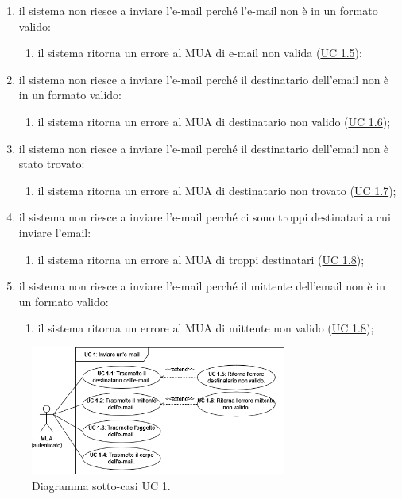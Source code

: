 \begin{itemize}
        \begin{enumerate}[label=\alph*.]
            \item il sistema non riesce a inviare l'e-mail perché l'e-mail non è in un formato valido:
            \begin{enumerate}[label=\arabic*.]
                \item il sistema ritorna un errore al MUA di e-mail non valida (\hyperref[sec:UC1.5]{UC 1.5});
            \end{enumerate}
            \item il sistema non riesce a inviare l'e-mail perché il destinatario dell'email non è in un formato valido:
            \begin{enumerate}[label=\arabic*.]
                \item il sistema ritorna un errore al MUA di destinatario non valido (\hyperref[sec:UC1.6]{UC 1.6});
            \end{enumerate}
            \item il sistema non riesce a inviare l'e-mail perché il destinatario dell'email non è stato trovato:
            \begin{enumerate}[label=\arabic*.]
                \item il sistema ritorna un errore al MUA di destinatario non trovato (\hyperref[sec:UC1.7]{UC 1.7});
            \end{enumerate}
            \item il sistema non riesce a inviare l'e-mail perché ci sono troppi destinatari a cui inviare l'email:
            \begin{enumerate}[label=\arabic*.]
                \item il sistema ritorna un errore al MUA di troppi destinatari (\hyperref[sec:UC1.8]{UC 1.8});
            \end{enumerate}
            \item il sistema non riesce a inviare l'e-mail perché il mittente dell'email non è in un formato valido:
            \begin{enumerate}[label=\arabic*.]
                \item il sistema ritorna un errore al MUA di mittente non valido (\hyperref[sec:UC1.8]{UC 1.8});
            \end{enumerate}
        \end{enumerate}
    \end{itemize}

    \begin{figure}[h]
        \includegraphics[width=0.75\textwidth]{sections/uc_imgs/UC01.X.png}
        \centering
        \caption{Diagramma sotto-casi UC 1.}
    \end{figure}

